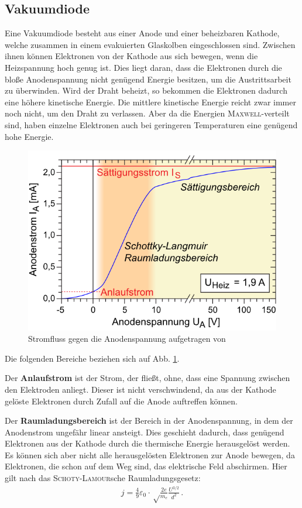\documentclass[12pt,a4paper,titlepage,headinclude,bibtotoc]{scrartcl}
\begin{document}
\subsection{Vakuumdiode}
Eine Vakuumdiode besteht aus einer Anode und einer beheizbaren Kathode, welche zusammen in einem evakuierten Glaskolben eingeschlossen sind.
Zwischen ihnen können Elektronen von der Kathode aus sich bewegen, wenn die Heizspannung hoch genug ist.
Dies liegt daran, dass die Elektronen durch die bloße Anodenspannung nicht genügend Energie besitzen, um die Austrittsarbeit zu überwinden.
Wird der Draht beheizt, so bekommen die Elektronen dadurch eine höhere kinetische Energie.
Die mittlere kinetische Energie reicht zwar immer noch nicht, um den Draht zu verlassen.
Aber da die Energien \textsc{Maxwell}-verteilt sind, haben einzelne Elektronen auch bei geringeren Temperaturen eine genügend hohe Energie.\\
\begin{figure}[!h]
\centering
\includegraphics{stromfluss}
\caption{Stromfluss gegen die Anodenspannung aufgetragen von \cite[8.10.14, 12 Uhr]{LP17}}
\label{fig:strombild}
\end{figure}

Die folgenden Bereiche beziehen sich auf Abb. \ref{fig:strombild}.

Der \textbf{Anlaufstrom} ist der Strom, der fließt, ohne, dass eine Spannung zwischen den Elektroden anliegt.
Dieser ist nicht verschwindend, da aus der Kathode gelöste Elektronen durch Zufall auf die Anode auftreffen können.

Der \textbf{Raumladungsbereich} ist der Bereich in der Anodenspannung, in dem der Anodenstrom ungefähr linear ansteigt.
Dies geschieht dadurch, dass genügend Elektronen aus der Kathode durch die thermische Energie herausgelöst werden.
Es können sich aber nicht alle herausgelösten Elektronen zur Anode bewegen, da Elektronen, die schon auf dem Weg sind, das elektrische Feld abschirmen.
Hier gilt nach \cite[S. 475]{gerthsen} das \textsc{Schoty-Lamour}sche Raumladungsgesetz:
\begin{align}
j=\frac{4}{9}\varepsilon_0\cdot\sqrt\frac{2e}{m_e}\frac{U^{3/2}}{d^2}\, .\label{eq:rauml}
\end{align}
\end{document}
